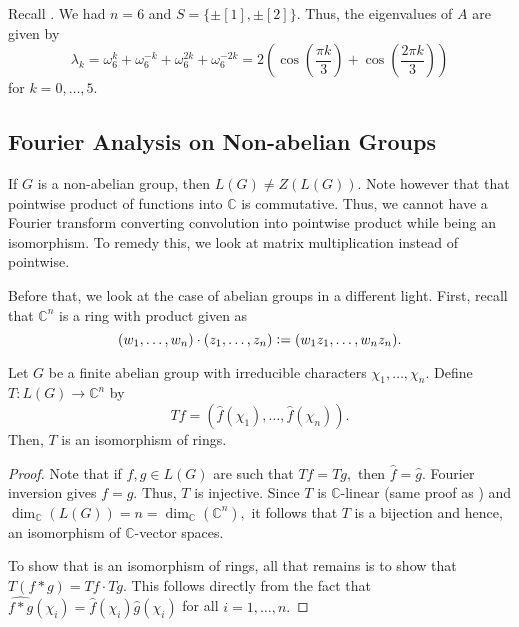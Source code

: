 \begin{ex}
    Recall . We had $n = 6$ and $S = \{\pm [1], \pm [2]\}.$ Thus, the eigenvalues of $A$ are given by
    \begin{equation*} 
        \lambda_k = \omega_6^k + \omega_6^{-k} + \omega_6^{2k} + \omega_6^{-2k} = 2\left(\cos\left(\frac{\pi k}{3}\right) + \cos\left(\frac{2\pi k}{3}\right)\right)
    \end{equation*}
    for $k = 0, \ldots, 5.$
\end{ex}

\subsection{Fourier Analysis on Non-abelian Groups}

If $G$ is a non-abelian group, then $L(G) \neq Z(L(G)).$ Note however that that pointwise product of functions into $\mathbb{C}$ is commutative. Thus, we cannot have a Fourier transform converting convolution into pointwise product while being an isomorphism. To remedy this, we look at matrix multiplication instead of pointwise.

Before that, we look at the case of abelian groups in a different light. First, recall that $\mathbb{C}^n$ is a ring with product given as
\begin{equation*} 
    (w_1, \ldots, w_n) \cdot (z_1, \ldots, z_n) \vcentcolon= (w_1z_1, \ldots, w_nz_n).
\end{equation*}

\begin{prop}
    Let $G$ be a finite abelian group with irreducible characters $\chi_1, \ldots, \chi_n.$ Define $T : L(G) \to \mathbb{C}^n$ by
    \begin{equation*} 
        Tf = (\widehat{f}(\chi_1), \ldots, \widehat{f}(\chi_n)).
    \end{equation*}
    Then, $T$ is an isomorphism of rings.
\end{prop}
\begin{proof} 
    Note that if $f, g \in L(G)$ are such that $Tf = Tg,$ then $\widehat{f} = \widehat{g}.$ Fourier inversion gives $f = g.$ Thus, $T$ is injective. Since $T$ is $\mathbb{C}$-linear (same proof as ) and $\dim_{\mathbb{C}}(L(G)) = n = \dim_{\mathbb{C}}(\mathbb{C}^n),$ it follows that $T$ is a bijection and hence, an isomorphism of $\mathbb{C}$-vector spaces.

    To show that is an isomorphism of rings, all that remains is to show that $T(f * g) = Tf \cdot Tg.$ This follows directly from the fact that $\widehat{f * g}(\chi_i) = \widehat{f}(\chi_i)\widehat{g}(\chi_i)$ for all $i = 1, \ldots, n.$
\end{proof}

